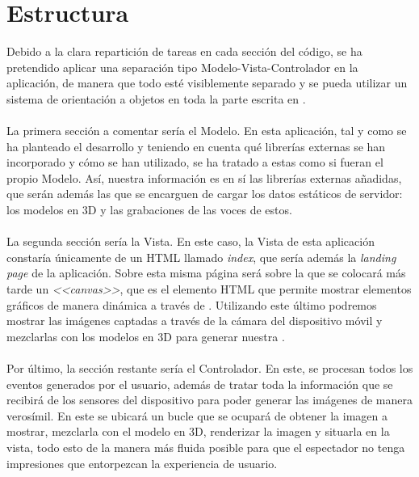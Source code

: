 \documentclass{subfiles}
\begin{document}

        \section{Estructura}
        \label{sec:estructura}
        Debido a la clara repartición de tareas en cada sección del código, se ha pretendido aplicar una separación tipo Modelo-Vista-Controlador en la aplicación, de manera que todo esté visiblemente separado y se pueda utilizar un sistema de orientación a objetos en toda la parte escrita en \js.

        \paragraph{}
        La primera sección a comentar sería el Modelo. En esta aplicación, tal y como se ha planteado el desarrollo y teniendo en cuenta qué librerías externas se han incorporado y cómo se han utilizado, se ha tratado a estas como si fueran el propio Modelo. Así, nuestra información es en sí las librerías externas añadidas, que serán además las que se encarguen de cargar los datos estáticos de servidor: los modelos en 3D y las grabaciones de las voces de estos.

        \paragraph{}
        La segunda sección sería la Vista. En este caso, la Vista de esta aplicación constaría únicamente de un HTML llamado \textit{index}, que sería además la \textit{landing page} de la aplicación. Sobre esta misma página será sobre la que se colocará más tarde un \textit{<<canvas>>}, que es el elemento HTML que permite mostrar elementos gráficos de manera dinámica a través de \js. Utilizando este último podremos mostrar las imágenes captadas a través de la cámara del dispositivo móvil y mezclarlas con los modelos en 3D para generar nuestra \ra.

        \paragraph{}
        Por último, la sección restante sería el Controlador. En este, se procesan todos los eventos generados por el usuario, además de tratar toda la información que se recibirá de los sensores del dispositivo para poder generar las imágenes de manera verosímil. En este se ubicará un bucle que se ocupará de obtener la imagen a mostrar, mezclarla con el modelo en 3D, renderizar la imagen y situarla en la vista, todo esto de la manera más fluida posible para que el espectador no tenga impresiones que entorpezcan la experiencia de usuario.
\end{document}
